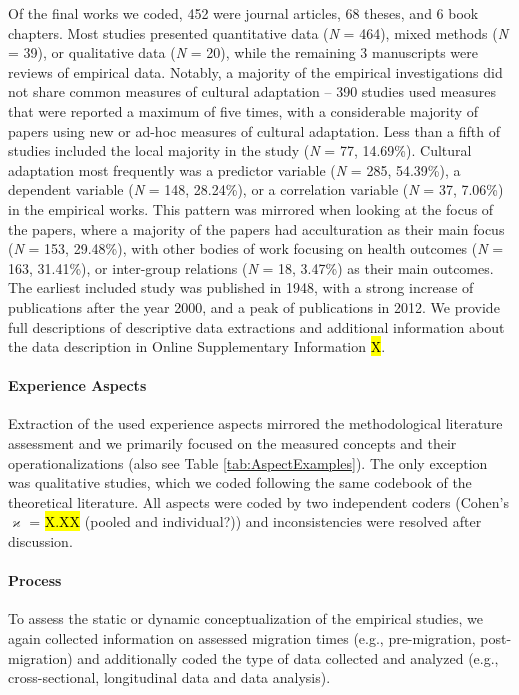 Of the final works we coded, 452 were journal articles, 68 theses, and 6
book chapters. Most studies presented quantitative data (\textit{N} =
464), mixed methods (\textit{N} = 39), or qualitative data (\textit{N} =
20), while the remaining 3 manuscripts were reviews of empirical data.
Notably, a majority of the empirical investigations did not share common
measures of cultural adaptation -- 390 studies used measures that were
reported a maximum of five times, with a considerable majority of papers
using new or ad-hoc measures of cultural adaptation. Less than a fifth
of studies included the local majority in the study (\textit{N} = 77,
14.69\%). Cultural adaptation most frequently was a predictor variable
(\textit{N} = 285, 54.39\%), a dependent variable (\textit{N} = 148,
28.24\%), or a correlation variable (\textit{N} = 37, 7.06\%) in the
empirical works. This pattern was mirrored when looking at the focus of
the papers, where a majority of the papers had acculturation as their
main focus (\textit{N} = 153, 29.48\%), with other bodies of work
focusing on health outcomes (\textit{N} = 163, 31.41\%), or inter-group
relations (\textit{N} = 18, 3.47\%) as their main outcomes. The earliest
included study was published in 1948, with a strong increase of
publications after the year 2000, and a peak of publications in 2012. We
provide full descriptions of descriptive data extractions and additional
information about the data description in Online Supplementary
Information \hl{X}.

\paragraph{Experience Aspects}

Extraction of the used experience aspects mirrored the methodological
literature assessment and we primarily focused on the measured concepts
and their operationalizations (also see Table \ref{tab:AspectExamples}).
The only exception was qualitative studies, which we coded following the
same codebook of the theoretical literature. All aspects were coded by
two independent coders (Cohen's \(\varkappa\) = \hl{X.XX} (pooled and
individual?)) and inconsistencies were resolved after discussion.

\paragraph{Process}

To assess the static or dynamic conceptualization of the empirical
studies, we again collected information on assessed migration times
(e.g., pre-migration, post-migration) and additionally coded the type of
data collected and analyzed (e.g., cross-sectional, longitudinal data
and data analysis).

